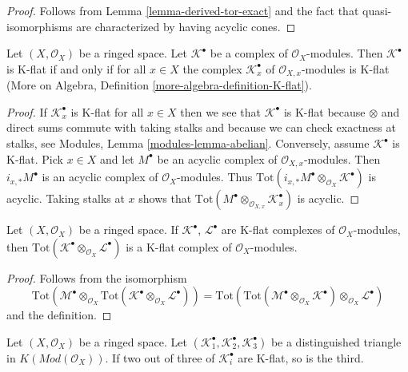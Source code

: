 \begin{proof}
Follows from
Lemma \ref{lemma-derived-tor-exact}
and the fact that quasi-isomorphisms are characterized by having
acyclic cones.
\end{proof}

\begin{lemma}
\label{lemma-check-K-flat-stalks}
Let $(X, \mathcal{O}_X)$ be a ringed space. Let $\mathcal{K}^\bullet$
be a complex of $\mathcal{O}_X$-modules. Then $\mathcal{K}^\bullet$
is K-flat if and only if for all $x \in X$ the complex
$\mathcal{K}_x^\bullet$ of $\mathcal{O}_{X, x}$-modules is K-flat
(More on Algebra, Definition \ref{more-algebra-definition-K-flat}).
\end{lemma}

\begin{proof}
If $\mathcal{K}_x^\bullet$ is K-flat for all $x \in X$ then we see
that $\mathcal{K}^\bullet$ is K-flat because $\otimes$ and
direct sums commute with taking stalks and because we can check exactness
at stalks, see
Modules, Lemma \ref{modules-lemma-abelian}.
Conversely, assume $\mathcal{K}^\bullet$ is K-flat. Pick $x \in X$
and let
$M^\bullet$ be an acyclic complex of $\mathcal{O}_{X, x}$-modules.
Then $i_{x, *}M^\bullet$ is an acyclic complex of $\mathcal{O}_X$-modules.
Thus $\text{Tot}(i_{x, *}M^\bullet \otimes_{\mathcal{O}_X} \mathcal{K}^\bullet)$
is acyclic. Taking stalks at $x$ shows that
$\text{Tot}(M^\bullet \otimes_{\mathcal{O}_{X, x}} \mathcal{K}_x^\bullet)$
is acyclic.
\end{proof}

\begin{lemma}
\label{lemma-tensor-product-K-flat}
Let $(X, \mathcal{O}_X)$ be a ringed space.
If $\mathcal{K}^\bullet$, $\mathcal{L}^\bullet$ are K-flat complexes
of $\mathcal{O}_X$-modules, then
$\text{Tot}(\mathcal{K}^\bullet \otimes_{\mathcal{O}_X} \mathcal{L}^\bullet)$
is a K-flat complex of $\mathcal{O}_X$-modules.
\end{lemma}

\begin{proof}
Follows from the isomorphism
$$
\text{Tot}(\mathcal{M}^\bullet \otimes_{\mathcal{O}_X}
\text{Tot}(\mathcal{K}^\bullet \otimes_{\mathcal{O}_X} \mathcal{L}^\bullet))
=
\text{Tot}(\text{Tot}(\mathcal{M}^\bullet \otimes_{\mathcal{O}_X}
\mathcal{K}^\bullet) \otimes_{\mathcal{O}_X} \mathcal{L}^\bullet)
$$
and the definition.
\end{proof}

\begin{lemma}
\label{lemma-K-flat-two-out-of-three}
Let $(X, \mathcal{O}_X)$ be a ringed space.
Let $(\mathcal{K}_1^\bullet, \mathcal{K}_2^\bullet, \mathcal{K}_3^\bullet)$
be a distinguished triangle in $K(\textit{Mod}(\mathcal{O}_X))$.
If two out of three of $\mathcal{K}_i^\bullet$ are K-flat, so is the third.
\end{lemma}

